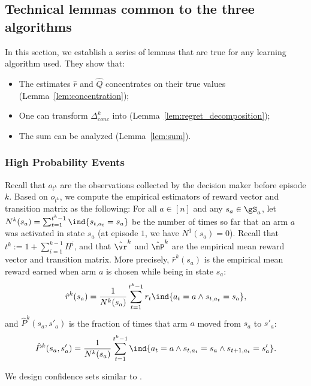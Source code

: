\begin{subappendices}
\subsection{Technical lemmas common to the three algorithms}
\label{ssec:technical_lemmas}

In this section, we establish a series of lemmas that are true for any learning algorithm used. They show that:
\begin{itemize}
    \item The estimates $\hat{r}$ and $\hat{Q}$ concentrates on their true values (Lemma~\ref{lem:concentration});
    \item One can transform $\Delta_{conc}^k$ into  (Lemma~\ref{lem:regret_decomposition});
    \item The sum  can be analyzed (Lemma~\ref{lem:sum}).
\end{itemize}

\subsubsection{High Probability Events}

Recall that $o_{t^k}$ are the observations collected by the decision maker before episode $k$. Based on $o_{t^k}$, we compute the empirical estimators of reward vector and transition matrix as the following: For all $a\in[n]$ and any $s_a\in\gS_a$, let $N^{k}(s_a)=\sum_{t=1}^{t^{k}-1}\ind{s_{t,a_t}=s_a}$ be the number of times so far that an arm $a$ was activated in state $s_a$ (at episode $1$, we have ${N^1(s_a)=0}$).
Recall that $t^{k}{:=} 1 {+}\sum_{i=1}^{k-1}H^i$, and that $\hat{\vr}^{k}$ and $\hat{\mP}^{k}$ are the empirical mean reward vector and transition matrix. More precisely, $\hat{r}^{k}(s_a)$ is the empirical mean reward earned when arm $a$ is chosen while being in state $s_a$:
\begin{align*}
    \hat{r}^{k}(s_a) = \frac{1}{N^{k}(s_a)}\sum_{t=1}^{t^{k}-1} r_t\ind{a_t=a \land s_{t,a_t}=s_a},
\end{align*}
and $\hat{P}^{k}(s_a,s'_a)$ is the fraction of times that arm $a$ moved from $s_a$ to $s'_a$:
\begin{align*}
    \hat{P}^{k}(s_a,s'_a) = \frac{1}{N^{k}(s_a)}\sum_{t=1}^{t^{k}-1} \ind{a_t=a \land s_{t,a_t}=s_a \land s_{t+1,a_t}=s'_a}.
\end{align*}

We design confidence sets similar to \cite{jaksch2010near,bartlett2012regal}.


\end{subappendices}
